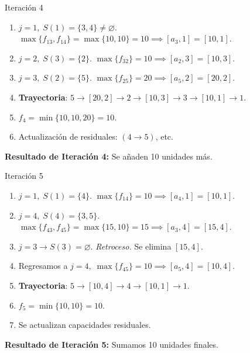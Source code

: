 \documentclass{beamer}
\begin{document}
\begin{frame}{Iteración 4}
\small
\begin{enumerate}
    \item \(\displaystyle j=1,\; S(1)=\{3,4\}\neq \varnothing\). 
          \(\max\{f_{13}, f_{14}\} = \max\{10,10\}=10\implies[a_3,1]=[10,1]\).
    \item \(\displaystyle j=2,\; S(3)=\{2\}\). 
          \(\max\{f_{32}\}=10\implies [a_2,3]=[10,3]\).
    \item \(\displaystyle j=3,\; S(2)=\{5\}\). 
          \(\max\{f_{25}\}=20\implies [a_5,2]=[20,2]\).
    \item \textbf{Trayectoria}: \(5 \to [20,2] \to 2 \to [10,3] \to 3 \to [10,1] \to 1\).
    \item \(\displaystyle f_4 = \min\{10,10,20\} = 10\).
    \item Actualización de residuales: 
          \((4\to5)\), etc.
\end{enumerate}

\textbf{Resultado de Iteración 4:} Se añaden 10 unidades más.
\end{frame}

\begin{frame}{Iteración 5}
\small
\begin{enumerate}
    \item \(\displaystyle j=1,\; S(1)=\{4\}\). 
          \(\max\{f_{14}\}=10 \implies [a_4,1]=[10,1]\).
    \item \(\displaystyle j=4,\; S(4)=\{3,5\}\). 
          \(\max\{f_{43}, f_{45}\}=\max\{15,10\}=15\implies[a_3,4]=[15,4]\).
    \item \(\displaystyle j=3 \to S(3)= \varnothing \). \emph{Retroceso.}
          Se elimina \([15,4]\).  
    \item Regresamos a \(j=4,\;\max\{f_{45}\}=10 \implies [a_5,4]=[10,4]\).
    \item \textbf{Trayectoria}: \(5\to[10,4]\to4\to[10,1]\to1\).
    \item \(\displaystyle f_5 = \min\{10,10\}=10\).
    \item Se actualizan capacidades residuales.
\end{enumerate}

\textbf{Resultado de Iteración 5:} Sumamos 10 unidades finales.
\end{frame}
\end{document}
